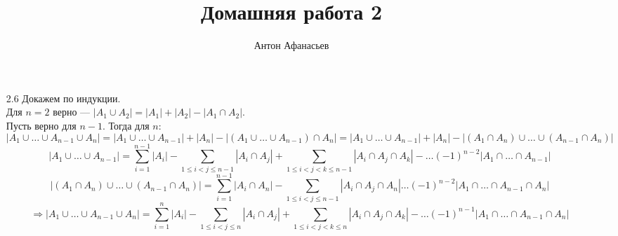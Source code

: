 \documentclass[10pt]{article}
\begin{document}
\title{Домашняя работа 2}
\author{Антон Афанасьев}
\maketitle

\begin{enumerate}
	\item[2.6] Докажем по индукции.\\
	Для $n=2$ верно --- $|A_1 \cup A_2| = |A_1| + |A_2| - |A_1 \cap A_2|$.\\
	Пусть верно для $n-1$. Тогда для $n$:
	$$|A_1 \cup \ldots \cup A_{n-1} \cup A_n| = |A_1 \cup \ldots \cup A_{n-1}| + |A_n| - |(A_1 \cup \ldots \cup A_{n-1}) \cap A_n| = |A_1 \cup \ldots \cup A_{n-1}| + |A_n| - |(A_1 \cap A_n) \cup \ldots \cup (A_{n-1} \cap A_n)|$$
	$$|A_1 \cup \ldots \cup A_{n-1}| = \sum_{i=1}^{n-1} |A_i| - \sum_{1 \leqslant  i < j \leqslant  n-1} {|A_i \cap A_j|} + \sum_{1 \leqslant  i < j < k \leqslant  n-1} |A_i \cap A_j \cap A_k| - \ldots (-1)^{n-2}|A_1 \cap \ldots \cap A_{n-1}|$$
	$$|(A_1 \cap A_n) \cup \ldots \cup (A_{n-1} \cap A_n)| = \sum_{i=1}^{n-1} |A_i \cap A_n| - \sum_{1 \leqslant i < j \leqslant n-1} |A_i \cap A_j \cap A_n| \ldots (-1)^{n-2}|A_1 \cap \ldots \cap A_{n-1} \cap A_n|$$
	$$\Rightarrow |A_1 \cup \ldots \cup A_{n-1} \cup A_n| = \sum_{i=1}^n |A_i| - \sum_{1 \leqslant i < j \leqslant n} |A_i \cap A_j| + \sum_{1 \leqslant  i < j < k \leqslant  n} |A_i \cap A_j \cap A_k| - \ldots (-1)^{n-1} |A_1 \cap \ldots \cap A_{n-1} \cap A_n|$$
\end{enumerate}
\end{document}
